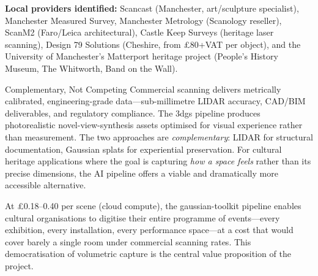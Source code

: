 \noindent\textbf{Local providers identified:} Scancast (Manchester, art/sculpture specialist), Manchester Measured Survey, Manchester Metrology (Scanology reseller), ScanM2 (Faro/Leica architectural), Castle Keep Surveys (heritage laser scanning), Design 79 Solutions (Cheshire, from \pounds80+VAT per object), and the University of Manchester's Matterport heritage project (People's History Museum, The Whitworth, Band on the Wall).

\begin{technote}{Complementary, Not Competing}
Commercial scanning delivers metrically calibrated, engineering-grade data---sub-millimetre LIDAR accuracy, CAD/BIM deliverables, and regulatory compliance. The \acrshort{3dgs} pipeline produces photorealistic novel-view-synthesis assets optimised for visual experience rather than measurement. The two approaches are \emph{complementary}: LIDAR for structural documentation, Gaussian splats for experiential preservation. For cultural heritage applications where the goal is capturing \emph{how a space feels} rather than its precise dimensions, the AI pipeline offers a viable and dramatically more accessible alternative.
\end{technote}

At \pounds0.18--0.40 per scene (cloud compute), the gaussian-toolkit pipeline enables cultural organisations to digitise their entire programme of events---every exhibition, every installation, every performance space---at a cost that would cover barely a single room under commercial scanning rates. This democratisation of volumetric capture is the central value proposition of the project.
